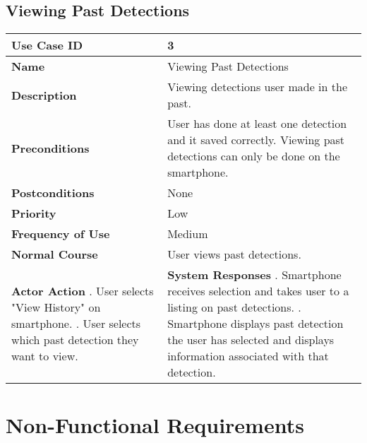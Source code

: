 \documentclass[12pt]{article}
\begin{document}
\subsection{Viewing Past Detections}
\begin{center}  
  \begin{tabular}{ |p{2.5in}|p{3in}| }
  \hline
  \textbf{Use Case ID} & 3 \\[.25in] 
  \hline
  \textbf{Name} & Viewing Past Detections \\[.25in] 
  \hline 
  \textbf{Description} & Viewing detections user made in the past. \\[.25in] 
  \hline 
  \textbf{Preconditions} & 
     User has done at least one detection and it saved correctly. Viewing past detections can only be done on the smartphone. \\
  \hline
  \textbf{Postconditions} & None \\[.25in] 
  \hline
  \textbf{Priority} & Low \\[.25in] 
  \hline 
  \textbf{Frequency of Use} & Medium \\[.25in] 
  \hline 
  \textbf{Normal Course} & User views past detections. \\[.25in] 
  \hline 
  \textbf{Actor Action} \newline \newline 
  1. User selects "View History" on smartphone. \newline \newline
  3. User selects which past detection they want to view. \newline
  & \textbf{System Responses} \newline \newline
  2. Smartphone receives selection and takes user to a listing on past detections. \newline \newline
  4. Smartphone displays past detection the user has selected and displays information associated with that detection. \\[.25in] 
  \hline
  \end{tabular}
\end{center}



\section{Non-Functional Requirements}
\end{document}
